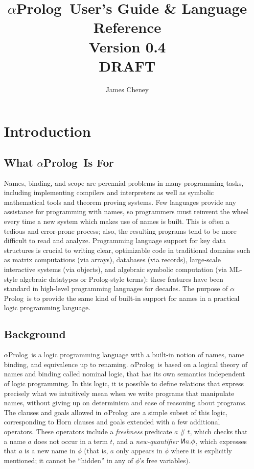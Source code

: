 \documentclass[draft,12pt]{report}
\newcommand{\aprolog}{$\alpha${Prolog}\xspace}
\newcommand{\fresh}{\mathrel\#}
\newcommand{\new}{\reflectbox{\sf N}}
\begin{document}
\title{\aprolog\ User's Guide \& Language Reference\\
  Version 0.4\\
  DRAFT} \author{James Cheney}

\maketitle
\tableofcontents

\chapter{Introduction}

\section{What \aprolog\ Is For}
Names, binding, and scope are perennial problems in many programming
tasks, including implementing compilers and interpreters as well as
symbolic mathematical tools and theorem proving systems.  Few
languages provide any assistance for programming with names, so
programmers must reinvent the wheel every time a new system which
makes use of names is built.  This is often a tedious and error-prone
process; also, the resulting programs tend to be more difficult to
read and analyze.  Programming language support for key data
structures is crucial to writing clear, optimizable code in
traditional domains such as matrix computations (via arrays),
databases (via records), large-scale interactive systems (via
objects), and algebraic symbolic computation (via ML-style algebraic
datatypes or Prolog-style terms): these features have been standard in
high-level programming languages for decades.  The purpose of
\aprolog\ is to provide the same kind of built-in support for names in
a practical logic programming language.

\section{Background}

\aprolog\ is a logic programming language with a built-in notion of
names, name binding, and equivalence up to renaming.  \aprolog\ is
based on a logical theory of names and binding called nominal logic,
that has its own semantics independent of logic programming.  In this
logic, it is possible to define relations that express precisely what
we intuitively mean when we write programs that manipulate names,
without giving up on determinism and ease of reasoning about programs.
The clauses and goals allowed in \aprolog\ are a simple subset of this
logic, corresponding to Horn clauses and goals extended with a few
additional operators.  These operators include a \emph{freshness}
predicate $a \fresh t$, which checks that a name $a$ does not occur in
a term $t$, and a \emph{new-quantifier} $\new a. \phi$, which
expresses that $a$ is a new name in $\phi$ (that is, $a$ only appears
in $\phi$ where it is explicitly mentioned; it cannot be ``hidden'' in
any of $\phi$'s free variables).
\end{document}
